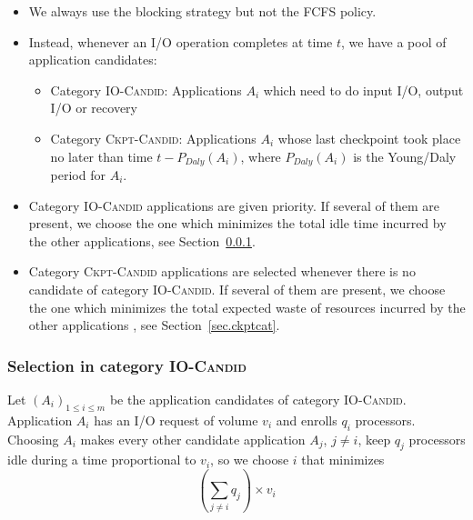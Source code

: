 \documentclass{article}
\newcommand{\period}[1]{P_{#1}}
\newcommand{\IOcat}{\textsc{IO-Candid}\xspace}
\newcommand{\Ckptcat}{\textsc{Ckpt-Candid}\xspace}
\begin{document}
\begin{itemize}
  \item We always use the blocking strategy but not the FCFS policy.
  \item Instead, whenever an I/O operation completes at time $t$, we have a pool of application candidates:
  \begin{itemize}
   \item Category \IOcat: Applications $A_{i}$ which need to do input I/O, output I/O or recovery
  \item Category \Ckptcat: Applications $A_{i}$ whose last checkpoint took place no later than time $t - \period{Daly}(A_{i})$, where $\period{Daly}(A_{i})$ is the Young/Daly period for $A_{i}$.
  \end{itemize}
  \item Category \IOcat applications are given priority. If several of them are present, we choose the one
  which minimizes the total idle time incurred by the other applications, see Section~\ref{sec.iocat}.
  \item Category \Ckptcat applications are selected whenever there is no candidate of category \IOcat .
  If several of them are present, we choose the one
  which minimizes the total expected  waste of resources incurred by the other applications
  ,
  see Section~\ref{sec.ckptcat}.
\end{itemize}


\subsubsection{Selection in category \IOcat}
\label{sec.iocat}
  
  Let $(A_{i})_{1 \leq i \leq m}$ be the application candidates of category \IOcat. 
  Application $A_{i}$ has an I/O request of volume $v_{i}$ and enrolls $q_{i}$ processors.
  Choosing $A_{i}$ makes every other candidate application $A_{j}$, $j \neq i$, keep $q_{j}$ processors idle during a time
  proportional to $v_{i}$, so we choose $i$ that minimizes 
  $$(\sum_{j \neq i} q_{j}) \times v_{i}$$
    
\end{document}
